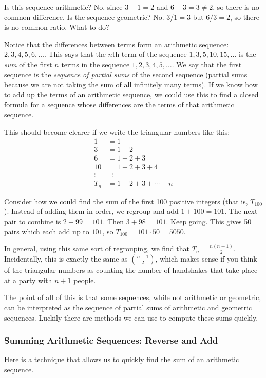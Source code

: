 \documentclass[12pt]{article}
\begin{document}
Is this sequence arithmetic?  No, since $3-1 = 2$ and $6-3 = 3 \ne 2$, so there is no common difference.  Is the sequence geometric?  No.  $3/1 = 3$ but $6/3 = 2$, so there is no common ratio.  What to do?  

Notice that the differences between terms form an arithmetic sequence: $2, 3, 4, 5, 6,\ldots$.  This says that the $n$th term of the sequence $1,3,5,10,15,\ldots$ is the {\em sum} of the first $n$ terms in the sequence $1,2,3,4,5,\ldots$.  We say that the first sequence is the {\em sequence of partial sums} of the second sequence (partial sums because we are not taking the sum of all infinitely many terms). If we know how to add up the terms of an arithmetic sequence, we could use this to find a closed formula for a sequence whose differences are the terms of that arithmetic sequence. 

This should become clearer if we write the triangular numbers like this:
\begin{align*}
1 &= 1\\
3 &= 1+2\\
6 &= 1 + 2 + 3\\
10 &= 1+2 + 3+ 4\\
\vdots & ~~~\vdots \\
T_n &= 1 + 2 + 3 + \cdots + n
\end{align*}

Consider how we could find the sum of the first 100 positive integers (that is, $T_{100}$).  Instead of adding them in order, we regroup and add $1+100 = 101$.  The next pair to combine is $2+99 = 101$.  Then $3+98 = 101$.  Keep going.  This gives 50 pairs which each add up to $101$, so $T_{100} = 101\cdot 50 = 5050$.

In general, using this same sort of regrouping, we find that $T_n = \frac{n(n+1)}{2}$.  Incidentally, this is exactly the same as ${n+1 \choose 2}$, which makes sense if you think of the triangular numbers as counting the number of handshakes that take place at a party with $n+1$ people.

The point of all of this is that some sequences, while not arithmetic or geometric, can be interpreted as the sequence of partial sums of arithmetic and geometric sequences.  Luckily there are methods we can use to compute these sums quickly.

\subsubsection*{Summing Arithmetic Sequences: Reverse and Add}
Here is a technique that allows us to quickly find the sum of an arithmetic sequence. 
\end{document}
